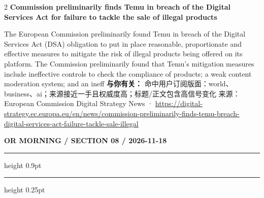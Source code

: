 \documentclass[10.5pt]{ctexart}
\begin{document}
\begin{multicols}{2}
\vspace{2mm}
{\large\bfseries Commission preliminarily finds Temu in breach of the Digital Services Act for failure to tackle the sale of illegal products}\par
The European Commission preliminarily found Temu in breach of the Digital Services Act (DSA) obligation to put in place reasonable, proportionate and effective measures to mitigate the risk of illegal products being offered on its platform. The Commission preliminarily found that Temu's mitigation measures include ineffective controls to check the compliance of products; a weak content moderation system; and an ineff
\textbf{与你有关：} 命中用户订阅版面：world、business、ai；来源接近一手且权威度高；标题/正文包含高信号变化
{\footnotesize\color{ormuted} 来源：European Commission Digital Strategy News · \url{https://digital-strategy.ec.europa.eu/en/news/commission-preliminarily-finds-temu-breach-digital-services-act-failure-tackle-sale-illegal}}
\end{multicols}
\newpage
{\small\bfseries OR MORNING / SECTION 08 / 2026-11-18}
\vspace{2mm}
\hrule height 0.9pt
\vspace{1.5mm}
\hrule height 0.25pt
\vspace{4mm}
\end{document}

